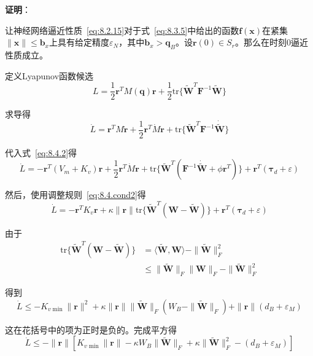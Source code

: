 \documentclass[12pt,a4paper]{ctexart}
\begin{document}
\textbf{证明}：

让神经网络逼近性质~\eqref{eq:8.2.15}对于式~\eqref{eq:8.3.5}中给出的函数$\bm{f}(\bm{x})$在紧集$\|\bm{x}\| \leq \bm{b}_x$上具有给定精度$\varepsilon_N$，其中$\bm{b}_x > \bm{q}_B$。设$\bm{r}(0) \in S_r$。那么在时刻0逼近性质成立。

定义Lyapunov函数候选
\begin{equation}\label{eq:8.4.lyap3}
L = \frac{1}{2}\bm{r}^T M(\bm{q})\bm{r} + \frac{1}{2}\text{tr}\{\tilde{\bm{W}}^T \bm{F}^{-1} \tilde{\bm{W}}\}
\end{equation}

求导得
\begin{equation}\label{eq:8.4.deriv4}
\dot{L} = \bm{r}^T M \dot{\bm{r}} + \frac{1}{2}\bm{r}^T \dot{M} \bm{r} + \text{tr}\{\tilde{\bm{W}}^T \bm{F}^{-1} \dot{\tilde{\bm{W}}}\}
\end{equation}

代入式~\eqref{eq:8.4.2}得
\begin{equation}\label{eq:8.4.subst5}
\dot{L} = -\bm{r}^T (V_m + K_v)\bm{r} + \frac{1}{2}\bm{r}^T \dot{M} \bm{r} + \text{tr}\{\tilde{\bm{W}}^T(\bm{F}^{-1}\dot{\tilde{\bm{W}}} + \phi\bm{r}^T)\} + \bm{r}^T(\bm{\tau}_d + \varepsilon)
\end{equation}

然后，使用调整规则~\eqref{eq:8.4.cond2}得
\begin{equation}\label{eq:8.4.tune6}
\dot{L} = -\bm{r}^T K_v \bm{r} + \kappa \|\bm{r}\| \text{tr}\{\tilde{\bm{W}}^T(\bm{W} - \tilde{\bm{W}})\} + \bm{r}^T(\bm{\tau}_d + \varepsilon)
\end{equation}

由于
\begin{align}
\text{tr}\{\tilde{\bm{W}}^T(\bm{W} - \tilde{\bm{W}})\} &= \langle \tilde{\bm{W}}, \bm{W} \rangle - \|\tilde{\bm{W}}\|_F^2 \\
&\leq \|\tilde{\bm{W}}\|_F \|\bm{W}\|_F - \|\tilde{\bm{W}}\|_F^2
\end{align}

得到
\begin{equation}\label{eq:8.4.result7}
\dot{L} \leq -K_{v\min}\|\bm{r}\|^2 + \kappa\|\bm{r}\|\|\tilde{\bm{W}}\|_F(W_B - \|\tilde{\bm{W}}\|_F) + \|\bm{r}\|(d_B + \varepsilon_M)
\end{equation}

这在花括号中的项为正时是负的。完成平方得
\begin{equation}
\dot{L} \leq -\|\bm{r}\|\left[K_{v\min}\|\bm{r}\| - \kappa W_B \|\tilde{\bm{W}}\|_F + \kappa\|\tilde{\bm{W}}\|_F^2 - (d_B + \varepsilon_M)\right]
\end{equation}
\end{document}

